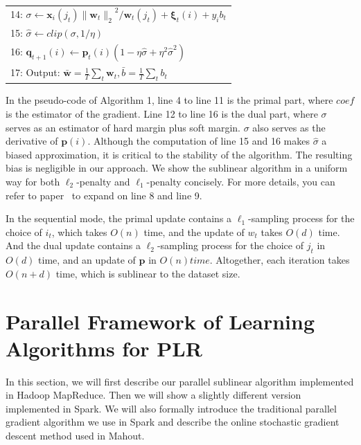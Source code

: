 \documentclass{llncs}
\newcommand{\bw}{\mathbf{w}}
\newcommand{\bp}{\mathbf{p}}
\newcommand{\bq}{\mathbf{q}}
\newcommand{\bxi}{\mathbf{\xi}}
\newcommand{\lc}{\left(}
\newcommand{\rc}{\right)}
\newcommand{\li}{\lc i\rc}
\newcommand{\tspace}{\hspace*{2em}}
\newcommand{\tspaces}{\hspace*{1.5em}}
\begin{document}
\begin{table} [ht]
\begin{tabular}{l}
	14:	\tspaces\tspace $\sigma \leftarrow \mathbf{x}_{i} \lc {j}_{t}\rc{\|{\bw}_{t}\|_2}^{2}/{\bw}_{t}\lc {j}_{t} \rc+{\bxi}_{t}\li+{y}_{i}{b}_{t}$ \\
	15:	\tspaces\tspace $\hat{\sigma} \leftarrow clip\lc \sigma,1/\eta \rc$ \\
	16:	\tspaces\tspace ${\bq}_{t+1}\li \leftarrow {\bp}_{t}\li\lc 1-\eta\hat{\sigma} + {\eta}^{2}{\hat{\sigma}}^{2} \rc$ \\
	17:	Output: $\bar{\bw}=\frac{1}{T}\sum_{t}{\bw}_{t},\bar{b}=\frac{1}{T}\sum_{t}{b}_{t}$ \\
	\hline
	\end{tabular} 	
	\label{alg:1}
	\end{table}
    
In the pseudo-code of Algorithm 1, line 4 to line 11 is the primal part, where $coef$ is the estimator of the gradient.
Line 12 to line 16 is the dual part, where $\sigma$ serves as an estimator of hard margin plus soft margin.
$\sigma$ also serves as the derivative of $\bp(i)$.
Although the computation of line 15 and 16 makes $\hat{\sigma}$ a biased approximation, it is critical to the stability of the algorithm. The resulting bias is negligible in our approach.
We show the sublinear algorithm in a uniform way for both $\ell_2$-penalty and $\ell_1$-penalty concisely.
For more details, you can refer to paper~\cite{peng2012sublinear} to expand on line 8 and line 9.

In the sequential mode, the primal update contains a $\ell_1$-sampling process for the choice of $i_t$, which takes $O(n)$ time, and the update of $w_t$ takes $O(d)$ time.
And the dual update contains a $\ell_2$-sampling process for the choice of $j_t$ in $O(d)$ time, and an update of $\bp$ in $O(n) time$.
Altogether, each iteration takes $O(n+d)$ time, which is sublinear to the dataset size.

\section{Parallel Framework of Learning Algorithms for PLR} \label{sec:framework}
In this section, we will first describe our parallel sublinear algorithm implemented in Hadoop MapReduce.
Then we will show a slightly different version implemented in Spark.
We will also formally introduce the traditional parallel gradient algorithm we use in Spark and describe the online stochastic gradient descent method used in Mahout.
\end{document}
